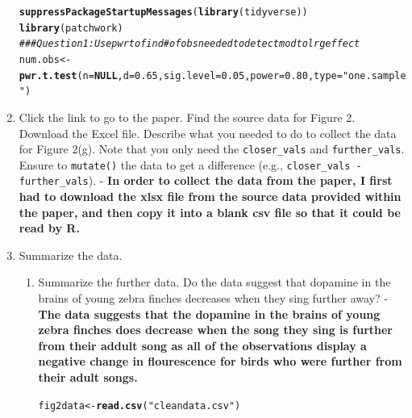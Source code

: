 \documentclass{article}\usepackage[]{graphicx}\usepackage[]{xcolor}
\makeatletter
\newcommand{\hlnum}[1]{\textcolor[rgb]{0.686,0.059,0.569}{#1}}%
\newcommand{\hlsng}[1]{\textcolor[rgb]{0.192,0.494,0.8}{#1}}%
\newcommand{\hlcom}[1]{\textcolor[rgb]{0.678,0.584,0.686}{\textit{#1}}}%
\newcommand{\hldef}[1]{\textcolor[rgb]{0.345,0.345,0.345}{#1}}%
\newcommand{\hlkwa}[1]{\textcolor[rgb]{0.161,0.373,0.58}{\textbf{#1}}}%
\newcommand{\hlkwb}[1]{\textcolor[rgb]{0.69,0.353,0.396}{#1}}%
\newcommand{\hlkwc}[1]{\textcolor[rgb]{0.333,0.667,0.333}{#1}}%
\newcommand{\hlkwd}[1]{\textcolor[rgb]{0.737,0.353,0.396}{\textbf{#1}}}%
\newenvironment{kframe}{%
 \def\at@end@of@kframe{}%
 \ifinner\ifhmode%
  \def\at@end@of@kframe{\end{minipage}}%
  \begin{minipage}{\columnwidth}%
 \fi\fi%
 \def\FrameCommand##1{\hskip\@totalleftmargin \hskip-\fboxsep
 \colorbox{shadecolor}{##1}\hskip-\fboxsep
     \hskip-\linewidth \hskip-\@totalleftmargin \hskip\columnwidth}%
 \MakeFramed {\advance\hsize-\width
   \@totalleftmargin\z@ \linewidth\hsize
   \@setminipage}}%
 {\par\unskip\endMakeFramed%
 \at@end@of@kframe}
\newenvironment{knitrout}{}{} %
\makeatother
\begin{document}
\begin{enumerate}
\begin{knitrout}
\begin{kframe}
{\ttfamily\noindent\color{warningcolor}{\#\# Warning: package 'effectsize' was built under R version 4.4.3}}\begin{alltt}
\hlkwd{suppressPackageStartupMessages}\hldef{(}\hlkwd{library}\hldef{(tidyverse))}
\hlkwd{library}\hldef{(patchwork)}
\hlcom{###Question 1: Use pwr to find # of obs needed to detect mod to lrg effect}
\hldef{num.obs} \hlkwb{<-} \hlkwd{pwr.t.test}\hldef{(}\hlkwc{n}\hldef{=}\hlkwa{NULL}\hldef{,} \hlkwc{d} \hldef{=} \hlnum{0.65}\hldef{,} \hlkwc{sig.level} \hldef{=} \hlnum{0.05}\hldef{,} \hlkwc{power} \hldef{=} \hlnum{0.80}\hldef{,} \hlkwc{type}\hldef{=}\hlsng{"one.sample"}\hldef{)}
\end{alltt}
\end{kframe}
\end{knitrout}
\item Click the link to go to the paper. Find the source data for 
Figure 2. Download the Excel file. Describe what you needed to
do to collect the data for Figure 2(g). Note that you only need the 
\texttt{closer\_vals} and \texttt{further\_vals}. Ensure to 
\texttt{mutate()} the data to get a difference 
(e.g., \texttt{closer\_vals - further\_vals}). - \textbf{In order to collect the data from the paper, I first had to download the xlsx file from the source data provided within the paper, and then copy it into a blank csv file so that it could be read by R.}
\item Summarize the data.
\begin{enumerate}
  \item Summarize the further data. Do the data suggest that
   dopamine in the brains of young zebra finches decreases when
   they sing further away? - \textbf{The data suggests that the dopamine in the brains of young zebra finches does decrease when the song they sing is further from their addult song as all of the observations display a negative change in flourescence for birds who were further from their adult songs.}
\begin{knitrout}\scriptsize
{}\color{fgcolor}\begin{kframe}
\begin{alltt}
\hldef{fig2data} \hlkwb{<-} \hlkwd{read.csv}\hldef{(}\hlsng{"cleandata.csv"}\hldef{)}

\end{alltt}
\end{kframe}
\end{knitrout}
\end{enumerate}
\end{enumerate}
\end{document}
